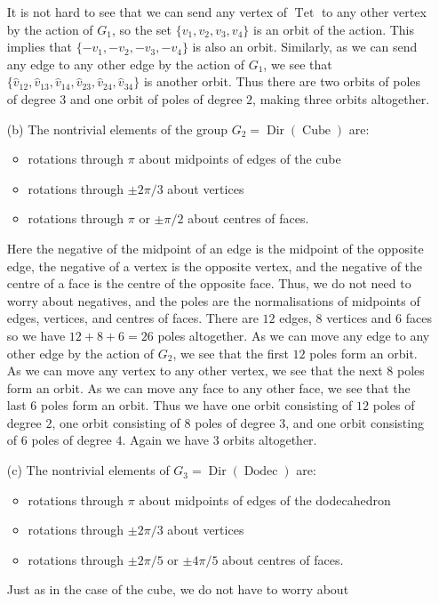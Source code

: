 \documentclass{amsart}
\DeclareMathOperator{\Tet}      {Tet}
\DeclareMathOperator{\Cube}     {Cube}
\DeclareMathOperator{\Dodec}    {Dodec}
\DeclareMathOperator{\Dir}      {Dir}
\newcommand{\vh}        {\hat{v}}
\renewcommand{\:}{\colon}
\theoremstyle{definition}
\begin{document}
\begin{itemize}
  It is not hard to see that we can send any vertex of $\Tet$ to any
  other vertex by the action of $G_1$, so the set
  $\{v_1,v_2,v_3,v_4\}$ is an orbit of the action.  This implies that
  $\{-v_1,-v_2,-v_3,-v_4\}$ is also an orbit.  Similarly, as we can
  send any edge to any other edge by the action of $G_1$, we see that
  $\{\vh_{12},\vh_{13},\vh_{14},\vh_{23},\vh_{24},\vh_{34}\}$ is
  another orbit.  Thus there are two orbits of poles of degree $3$ and
  one orbit of poles of degree $2$, making three orbits altogether.
 \item[(b)] The nontrivial elements of the group $G_2=\Dir(\Cube)$
  are:
  \begin{itemize}
  \item rotations through $\pi$ about midpoints of edges of the cube
  \item rotations through $\pm 2\pi/3$ about vertices
  \item rotations through $\pi$ or $\pm\pi/2$ about centres of faces.
  \end{itemize}
  Here the negative of the midpoint of an edge is the midpoint of the
  opposite edge, the negative of a vertex is the opposite vertex, and
  the negative of the centre of a face is the centre of the opposite
  face.  Thus, we do not need to worry about negatives, and the poles
  are the normalisations of midpoints of edges, vertices, and centres
  of faces.  There are $12$ edges, $8$ vertices and $6$ faces so we
  have $12+8+6=26$ poles altogether.  As we can move any edge to any
  other edge by the action of $G_2$, we see that the first $12$ poles
  form an orbit.  As we can move any vertex to any other vertex, we
  see that the next $8$ poles form an orbit.  As we can move any face
  to any other face, we see that the last $6$ poles form an orbit.
  Thus we have one orbit consisting of $12$ poles of degree $2$, one
  orbit consisting of $8$ poles of degree $3$, and one orbit
  consisting of $6$ poles of degree $4$.  Again we have $3$ orbits
  altogether.
 \item[(c)] The nontrivial elements of $G_3=\Dir(\Dodec)$ are:
  \begin{itemize}
  \item rotations through $\pi$ about midpoints of edges of the
   dodecahedron
  \item rotations through $\pm 2\pi/3$ about vertices
  \item rotations through $\pm 2\pi/5$ or $\pm 4\pi/5$ about centres
   of faces.
  \end{itemize}
  Just as in the case of the cube, we do not have to worry about

\end{itemize}
\end{document}
